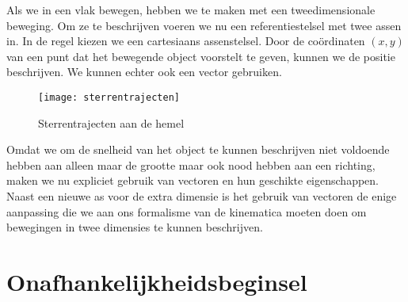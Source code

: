 \documentclass{ximera}
\begin{document}
	\author{Bart Lambregs}


	Als we in een vlak bewegen, hebben we te maken met een tweedimensionale beweging. 
	Om ze te beschrijven voeren we nu een referentiestelsel met twee assen in. In de regel kiezen we een cartesiaans assenstelsel.  Door de co\"ordinaten $(x,y)$ van een punt dat het bewegende object voorstelt te geven, kunnen we de positie beschrijven. We kunnen echter ook een vector gebruiken.
	\begin{figure}[h]
	\centering
	\texttt{[image: sterrentrajecten]}
	\caption{Sterrentrajecten aan de hemel}
	\end{figure}
	Omdat we om de snelheid van het object te kunnen beschrijven niet voldoende hebben aan alleen maar de grootte maar ook nood hebben aan een richting, maken we nu expliciet gebruik van vectoren en hun geschikte eigenschappen. Naast een nieuwe as voor de extra dimensie is het gebruik van vectoren de enige aanpassing die we aan ons formalisme van de kinematica moeten doen om bewegingen in twee dimensies te kunnen beschrijven.
	

	\section{Onafhankelijkheidsbeginsel}
	
\end{document}
